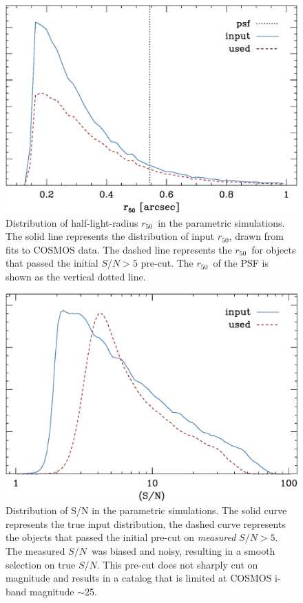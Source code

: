 \documentclass[iop]{emulateapj}
\newcommand{\snr}{$S/N$}
\newcommand{\hlr}{$r_{50}$}
\begin{document}
\begin{figure}
    \centering
    \includegraphics[width=\columnwidth]{run-bdj03mcal02-r50.eps}

    \caption{Distribution of half-light-radius \hlr\ in the parametric simulations.
        The solid line represents the distribution of input \hlr, drawn from fits
        to COSMOS data.  The dashed line represents the \hlr\ for objects that passed
		the initial $S/N > 5$ pre-cut.  The \hlr\ of the PSF is shown as the vertical dotted
        line.}

\label{fig:psimhlrcompare}
\end{figure}


\begin{figure}
    \centering
    \includegraphics[width=\columnwidth]{run-bdj03mcal02-s2n.eps}

    \caption{Distribution of S/N in the parametric simulations. The
    solid curve represents the true input distribution, the dashed curve 
	represents the objects that passed the initial pre-cut on {\it measured}
    \snr$ > 5$. The measured \snr\ was biased and noisy,
    resulting in a smooth selection on true \snr.  This pre-cut
    does not sharply cut on magnitude and results in a catalog that is
    limited at COSMOS i-band magnitude $\sim$25.}

\label{fig:s2n}
\end{figure}
\end{document}

